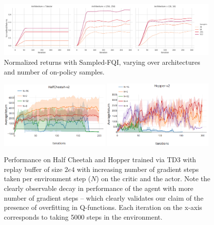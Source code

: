 \begin{figure}[h]
    \centering
    \includegraphics[width=0.99\textwidth]{images/sampling_returns}
\caption{\label{fig:sampling_arch_sweep} Normalized returns with Sampled-FQI, varying over architectures and number of on-policy samples.}
\end{figure}

\vspace{-30pt}
\begin{figure}[h]
    \centering
    \includegraphics[width=0.49\textwidth, scale=0.25]{images/grad_steps_td3.png}
    \includegraphics[width=0.49\textwidth, scale=0.25]{images/hopper_grad_steps_td3.png}
\caption{\label{fig:td3_grad_sweep} Performance on Half Cheetah and Hopper trained via TD3 with replay buffer of size $2e4$ with increasing number of gradient steps taken per environment step ($N$) on the critic and the actor. Note the clearly observable decay in performance of the agent with more number of gradient steps -- which clearly validates our claim of the presence of overfitting in Q-functions. Each iteration on the x-axis corresponds to taking 5000 steps in the environment.}

\end{figure}